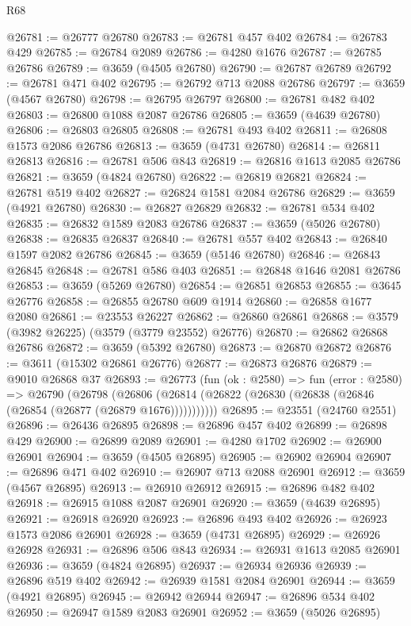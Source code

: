 \begin{lexlean}{R68}
\begin{coremodule}
@26781 := @26777 @26780
@26783 := @26781 @457 @402
@26784 := @26783 @429
@26785 := @26784 @2089
@26786 := @4280 @1676
@26787 := @26785 @26786
@26789 := @3659 (@4505 @26780)
@26790 := @26787 @26789
@26792 := @26781 @471 @402
@26795 := @26792 @713 @2088 @26786
@26797 := @3659 (@4567 @26780)
@26798 := @26795 @26797
@26800 := @26781 @482 @402
@26803 := @26800 @1088 @2087 @26786
@26805 := @3659 (@4639 @26780)
@26806 := @26803 @26805
@26808 := @26781 @493 @402
@26811 := @26808 @1573 @2086 @26786
@26813 := @3659 (@4731 @26780)
@26814 := @26811 @26813
@26816 := @26781 @506 @843
@26819 := @26816 @1613 @2085 @26786
@26821 := @3659 (@4824 @26780)
@26822 := @26819 @26821
@26824 := @26781 @519 @402
@26827 := @26824 @1581 @2084 @26786
@26829 := @3659 (@4921 @26780)
@26830 := @26827 @26829
@26832 := @26781 @534 @402
@26835 := @26832 @1589 @2083 @26786
@26837 := @3659 (@5026 @26780)
@26838 := @26835 @26837
@26840 := @26781 @557 @402
@26843 := @26840 @1597 @2082 @26786
@26845 := @3659 (@5146 @26780)
@26846 := @26843 @26845
@26848 := @26781 @586 @403
@26851 := @26848 @1646 @2081 @26786
@26853 := @3659 (@5269 @26780)
@26854 := @26851 @26853
@26855 := @3645 @26776
@26858 := @26855 @26780 @609 @1914
@26860 := @26858 @1677 @2080
@26861 := @23553 @26227
@26862 := @26860 @26861
@26868 := @3579 (@3982 @26225) (@3579 (@3779 @23552) @26776)
@26870 := @26862 @26868 @26786
@26872 := @3659 (@5392 @26780)
@26873 := @26870 @26872
@26876 := @3611 (@15302 @26861 @26776)
@26877 := @26873 @26876
@26879 := @9010 @26868 @37
@26893 := @26773
    (fun (ok : @2580) =>
    fun (error : @2580) =>
    @26790
      (@26798
        (@26806 (@26814 (@26822 (@26830 (@26838 (@26846 (@26854 (@26877 (@26879 @1676)))))))))))
@26895 := @23551 (@24760 @2551)
@26896 := @26436 @26895
@26898 := @26896 @457 @402
@26899 := @26898 @429
@26900 := @26899 @2089
@26901 := @4280 @1702
@26902 := @26900 @26901
@26904 := @3659 (@4505 @26895)
@26905 := @26902 @26904
@26907 := @26896 @471 @402
@26910 := @26907 @713 @2088 @26901
@26912 := @3659 (@4567 @26895)
@26913 := @26910 @26912
@26915 := @26896 @482 @402
@26918 := @26915 @1088 @2087 @26901
@26920 := @3659 (@4639 @26895)
@26921 := @26918 @26920
@26923 := @26896 @493 @402
@26926 := @26923 @1573 @2086 @26901
@26928 := @3659 (@4731 @26895)
@26929 := @26926 @26928
@26931 := @26896 @506 @843
@26934 := @26931 @1613 @2085 @26901
@26936 := @3659 (@4824 @26895)
@26937 := @26934 @26936
@26939 := @26896 @519 @402
@26942 := @26939 @1581 @2084 @26901
@26944 := @3659 (@4921 @26895)
@26945 := @26942 @26944
@26947 := @26896 @534 @402
@26950 := @26947 @1589 @2083 @26901
@26952 := @3659 (@5026 @26895)

\end{coremodule}
\end{lexlean}
